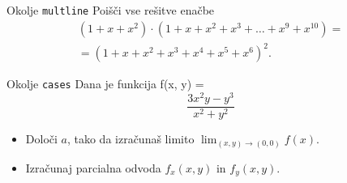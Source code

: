 \begin{frame}{Okolje \texttt{multline}}
	Poišči vse rešitve enačbe
	\begin{multline}
	(1+x+x^2) \cdot (1+x+x^2+x^3+\ldots+x^9+x^{10}) = \\
	=(1+x+x^2+x^3+x^4+x^5+x^6)^2.
	\end{multline}
\end{frame}

\begin{frame}{Okolje \texttt{cases}}
	Dana je funkcija
	f(x, y) =
\[
		\frac{3x^2y-y^3}{x^2+y^2}
\]
	\begin{itemize}
	\item Določi $a$, tako da izračunaš limito \( \lim_{(x,y)\to(0,0)} f(x). \)
	\item Izračunaj parcialna odvoda $f_x(x,y)$ in $f_y(x,y)$.
	\end{itemize}
\end{frame}
